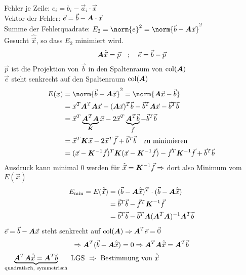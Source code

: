 Fehler je Zeile: $e_i = b_i - \vec a_i\cdot \vec x$\\
Vektor der Fehler: $\vec e = \vec b - \boldsymbol {A}\cdot \vec x$\\
Summe der Fehlerquadrate: $E_2 = \norm{e}^2 = \norm{\vec b - \ma A\vec x}^2$\\
Gesucht $\hat{\vec x}$, so dass $E_2$ minimiert wird.
\begin{equation}
\boldsymbol {A}\hat{\vec x} = \vec p \quad ; \quad \vec e = \vec b - \vec p
\end{equation}
$\vec p$ ist die Projektion von $\vec b$ in den Spaltenraum von $\operatorname{col}(\boldsymbol {A})$\\
$\vec e$ steht senkrecht auf den Spaltenraum $\operatorname{col}(\boldsymbol {A})$
\begin{equation}
\begin{split}
E(x) &= \norm{\vec b - \ma A\vec x}^2 = \norm{\ma A\vec x - \vec b}\\
&= \vec x^T\ma A^T\ma A\vec x - (\ma A\vec x)^T\vec b - \vec b^T\ma A\vec x - \vec b^T\vec b\\
&= \vec x^T\underbrace{\ma A^T\ma A}_{\ma K}\vec x - 2\vec x^T\underbrace{\ma A^T\vec b}_{\vec f} - \vec b^T\vec b\\
&= \vec x^T\ma K\vec x - 2\vec x^T\vec f + \vec b^T\vec b\quad\text{zu minimieren}\\
&= (\vec x-\ma K^{-1}\vec f)^T\ma K(\vec x-\ma K^{-1} \vec f) - \vec f^T\ma K^{-1}\vec f + \vec b^T\vec b
\end{split}
\end{equation}
Ausdruck kann minimal 0 werden für $\hat{\vec x} = \boldsymbol {K}^{-1}\vec f\Rightarrow$ dort also Minimum vom $E(\vec x)$
\begin{equation}
\begin{split}
E_\text{min} = E(\hat{\vec x}) &= (\vec b - \boldsymbol {A}\hat{\vec x})^T\cdot(\vec b - \boldsymbol {A}\hat{\vec x})\\
&= \vec b^T\vec b - \vec f^T\boldsymbol {K}^{-1}\vec f\\
&= \vec b^T\vec b - \vec b^T\boldsymbol {A}(\boldsymbol {A}^T\boldsymbol {A})^{-1}\boldsymbol {A}^T\vec b
\end{split}
\end{equation}
$\vec e = \vec b - \boldsymbol {A}\vec x$ steht senkrecht auf $\operatorname{col}(\boldsymbol {A})\Rightarrow\boldsymbol {A}^T\vec e = \vec 0$\\
\begin{equation}
\Rightarrow \boldsymbol {A}^T(\vec b - \boldsymbol {A}\hat{\vec x}) = 0 \Rightarrow \boldsymbol {A}^T\boldsymbol {A}\hat{\vec x} = \boldsymbol {A}^T\vec b
\end{equation}
$\underbrace{\boldsymbol {A}^T\boldsymbol {A}\hat{\vec x} = \boldsymbol {A}^T\vec b}_{\text{quadratisch, symmetrisch}} \text{ LGS }\Rightarrow\text{ Bestimmung von }\hat{\vec x}$

